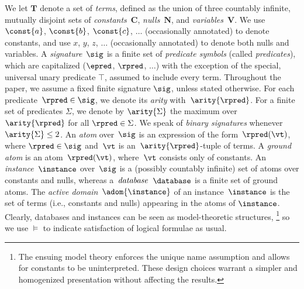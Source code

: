 \medskip {}
We let $\mathbf{T}$ denote a set of {\em terms}, defined as the union of three countably infinite, 
mutually disjoint sets of \emph{constants}~$\mathbf{C}$, \emph{nulls}~$\mathbf{N}$, and \emph{variables}~$\mathbf{V}$. We use $\const{a}$, $\const{b}$, $\const{c}$, $\ldots$ (occasionally annotated) to denote constants, and use $x$, $y$, $z$, $\ldots$ (occasionally annotated) to denote both nulls and variables.
A \emph{signature}~$\sig$ is a finite set of \emph{predicate symbols} (called \emph{predicates}), which are capitalized ($\epred$, $\rpred$, $\ldots$) with the exception of the special, universal unary predicate $\top$, assumed to include every term. %
 Throughout the paper, we assume a fixed finite signature $\sig$, unless stated otherwise. For each predicate~\mbox{$\rpred \in \sig$}, we denote its 
\emph{arity} with~$\arity{\rpred}$. For a finite set of predicates $\Sigma$, we denote by $\arity{\Sigma}$ the maximum over $\arity{\rpred}$ for all $\rpred\in\Sigma$. We speak of \emph{binary signatures} whenever $\arity{\Sigma} \leq 2$. An \emph{atom} over~$\sig$ is an expression  of the form~$\rpred(\vt)$, where $\rpred \in \sig$ and~$\vt$ is an~$\arity{\rpred}$-tuple of terms. A \emph{ground atom} is an atom~$\rpred(\vt)$, where~$\vt$ consists only of constants.
An \emph{instance}~$\instance$ over~$\sig$ is a (possibly countably infinite)
set of atoms over constants and nulls, whereas a~$\emph{database}$~$\database$ is
a finite set of ground atoms. The \emph{active domain}~$\adom{\instance}$ 
of an instance~$\instance$ is the set of terms (i.e., constants and nulls) appearing in the atoms of $\instance$. %
Clearly, databases and instances can be seen as model-theoretic structures,%
\footnote{The ensuing model theory enforces the unique name assumption and allows for constants to be uninter\-preted. These design choices warrant a simpler and homogenized presentation without affecting the results.} 
so we use %
$\models$ to indicate satisfaction of logical formulae as usual. 
